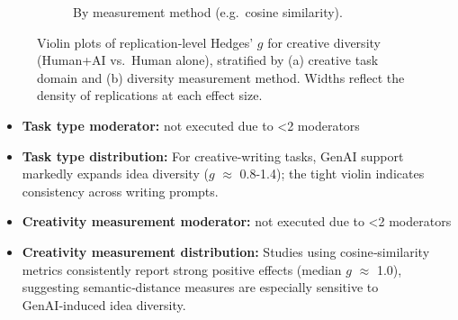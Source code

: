 \documentclass[manuscript, screen, review, acmsmall, anonymous]{acmart}
\begin{document}
\begin{figure}[H]
\begin{subfigure}[t]{0.49\linewidth}
    \caption{By measurement method (e.g.\ cosine similarity).}
    \label{fig:diversity_raw_violin_measurement}
  \end{subfigure}
  \caption{Violin plots of replication‐level Hedges’ $g$ for creative diversity (Human+AI vs.\ Human alone), stratified by (a) creative task domain and (b) diversity measurement method. Widths reflect the density of replications at each effect size.}
  \label{fig:diversity_raw_violins_task_measure}
\end{figure}
\begin{itemize}
  \item \textbf{Task type moderator:} not executed due to <2 moderators 
  \item \textbf{Task type distribution:} For creative‑writing tasks, GenAI support markedly expands idea diversity ($g$ $\approx$ 0.8-1.4); the tight violin indicates consistency across writing prompts.
  \item \textbf{Creativity measurement moderator:} not executed due to <2 moderators
  \item \textbf{Creativity measurement distribution:} Studies using cosine‑similarity metrics consistently report strong positive effects (median $g$ $\approx$ 1.0), suggesting semantic‑distance measures are especially sensitive to GenAI‑induced idea diversity.
\end{itemize}
\end{document}
